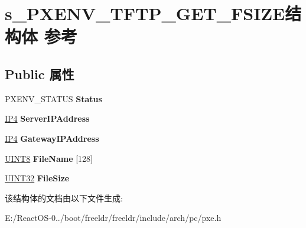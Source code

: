 \hypertarget{structs___p_x_e_n_v___t_f_t_p___g_e_t___f_s_i_z_e}{}\section{s\+\_\+\+P\+X\+E\+N\+V\+\_\+\+T\+F\+T\+P\+\_\+\+G\+E\+T\+\_\+\+F\+S\+I\+Z\+E结构体 参考}
\label{structs___p_x_e_n_v___t_f_t_p___g_e_t___f_s_i_z_e}
\subsection*{Public 属性}
\begin{DoxyCompactItemize}
\item 
\mbox{\label{structs___p_x_e_n_v___t_f_t_p___g_e_t___f_s_i_z_e_a47f0bbeac9dcead3f70ec5c8406b6ead}} 
P\+X\+E\+N\+V\+\_\+\+S\+T\+A\+T\+US {\bfseries Status}
\item 
\mbox{\label{structs___p_x_e_n_v___t_f_t_p___g_e_t___f_s_i_z_e_a2277b64106f16450648d0a186b5474b9}} 
\hyperlink{union_i_p4}{I\+P4} {\bfseries Server\+I\+P\+Address}
\item 
\mbox{\label{structs___p_x_e_n_v___t_f_t_p___g_e_t___f_s_i_z_e_ab5be901f5cfa08688d50a5aed8682aab}} 
\hyperlink{union_i_p4}{I\+P4} {\bfseries Gateway\+I\+P\+Address}
\item 
\mbox{\label{structs___p_x_e_n_v___t_f_t_p___g_e_t___f_s_i_z_e_a70e17eec7cc19c6fd07e15ebb316ab9a}} 
\hyperlink{_processor_bind_8h_ab27e9918b538ce9d8ca692479b375b6a}{U\+I\+N\+T8} {\bfseries File\+Name} \mbox{[}128\mbox{]}
\item 
\mbox{\label{structs___p_x_e_n_v___t_f_t_p___g_e_t___f_s_i_z_e_ad8b285e32df589342344cf762e288758}} 
\hyperlink{_processor_bind_8h_ae1e6edbbc26d6fbc71a90190d0266018}{U\+I\+N\+T32} {\bfseries File\+Size}
\end{DoxyCompactItemize}


该结构体的文档由以下文件生成\+:\begin{DoxyCompactItemize}
\item 
E\+:/\+React\+O\+S-\/0../boot/freeldr/freeldr/include/arch/pc/pxe.\+h\end{DoxyCompactItemize}
